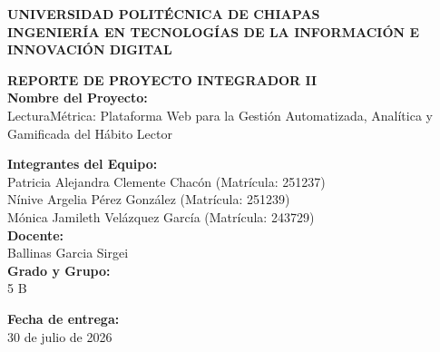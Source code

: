 \documentclass[12pt, atypical, journal]{article}
\begin{document}
\begin{titlepage}
   \begin{center}
       \vspace*{1cm}
      
       {\Large\bfseries UNIVERSIDAD POLITÉCNICA DE CHIAPAS} \\[0.5cm]
       {\large\bfseries INGENIERÍA EN TECNOLOGÍAS DE LA INFORMACIÓN E INNOVACIÓN DIGITAL} \\[1.5cm]
      
       \vfill
      
       {\Large\bfseries REPORTE DE PROYECTO INTEGRADOR II} \\[1cm]
      
       \textbf{Nombre del Proyecto:} \\
       {\large LecturaMétrica: Plataforma Web para la Gestión Automatizada, Analítica y Gamificada del Hábito Lector} \\[1.5cm]
      
       \vfill
      
       \textbf{Integrantes del Equipo:} \\[0.3cm]
       {\large Patricia Alejandra Clemente Chacón (Matrícula: 251237)} \\
       {\large Nínive Argelia Pérez González (Matrícula: 251239)} \\
       {\large Mónica Jamileth Velázquez García (Matrícula: 243729)} \\[1.5cm]
      
       \textbf{Docente:} \\
       {\large Ballinas Garcia Sirgei} \\[1.5cm]
       
       \textbf{Grado y Grupo:} \\
       {\large 5 B} \\[1.5cm]
      
       \vfill
      
       \textbf{Fecha de entrega:} \\
       {\large 30 de julio de 2026}
      
       \vspace*{1cm}
   \end{center}
\end{titlepage}

\newpage
\end{document}
